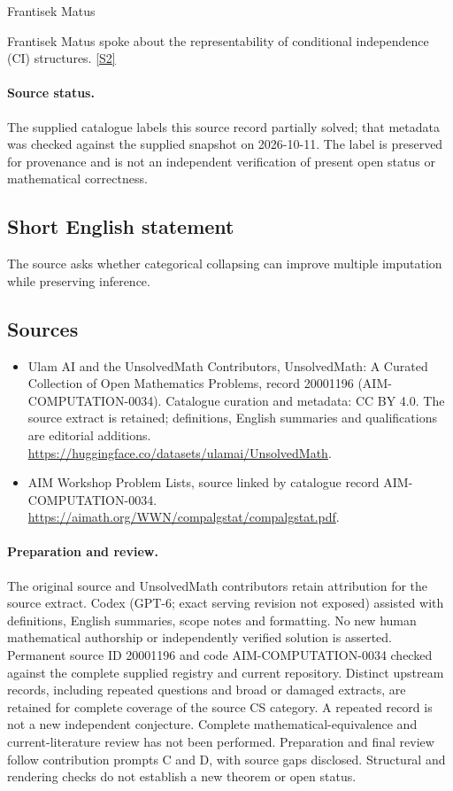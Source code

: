 \documentclass[11pt]{article}
\newcommand{\sref}[2]{\hyperlink{source:#1:#2}{[S#2]}}
\begin{document}
Frantisek Matus

Frantisek Matus spoke about the representability of conditional independence (CI) structures. \sref{20001196}{2}
\paragraph{Source status.}
The supplied catalogue labels this source record partially solved; that metadata was checked against the supplied snapshot on 2026-10-11. The label is preserved for provenance and is not an independent verification of present open status or mathematical correctness.
\subsection{Short English statement}
The source asks whether categorical collapsing can improve multiple imputation while preserving inference.
\subsection{Sources}
\begin{itemize}
\item[\hypertarget{source:20001196:1}{S1}] Ulam AI and the UnsolvedMath Contributors, UnsolvedMath: A Curated Collection of Open Mathematics Problems, record 20001196 (AIM-COMPUTATION-0034). Catalogue curation and metadata: CC BY 4.0. The source extract is retained; definitions, English summaries and qualifications are editorial additions.
\url{https://huggingface.co/datasets/ulamai/UnsolvedMath}.
\item[\hypertarget{source:20001196:2}{S2}] AIM Workshop Problem Lists, source linked by catalogue record AIM-COMPUTATION-0034.
\url{https://aimath.org/WWN/compalgstat/compalgstat.pdf}.
\end{itemize}
\paragraph{Preparation and review.}
The original source and UnsolvedMath contributors retain attribution for the source extract. Codex (GPT-6; exact serving revision not exposed) assisted with definitions, English summaries, scope notes and formatting. No new human mathematical authorship or independently verified solution is asserted. Permanent source ID 20001196 and code AIM-COMPUTATION-0034 checked against the complete supplied registry and current repository. Distinct upstream records, including repeated questions and broad or damaged extracts, are retained for complete coverage of the source CS category. A repeated record is not a new independent conjecture. Complete mathematical-equivalence and current-literature review has not been performed. Preparation and final review follow contribution prompts C and D, with source gaps disclosed. Structural and rendering checks do not establish a new theorem or open status.
\label{end:20001196}
\end{document}
